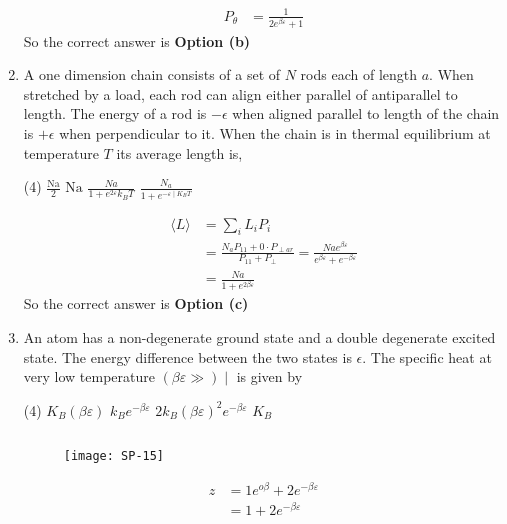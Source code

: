 \begin{enumerate}
\begin{answer}
\begin{align*}
		P_{\theta}&=\frac{1}{2 e^{\beta \varepsilon}+1}
		\end{align*}
		So the correct answer is \textbf{Option (b)}
	\end{answer}
	\item A one dimension chain consists of a set of $N$ rods each of length $a$. When stretched by a load, each rod can align either parallel of antiparallel to length. The energy of a rod is $-\epsilon$ when aligned parallel to length of the chain is $+\epsilon$ when perpendicular to it. When the chain is in thermal equilibrium at temperature $T$ its average length is,
	\begin{tasks}(4)
		\task[\textbf{a.}]$\frac{\mathrm{Na}}{2}$
		\task[\textbf{b.}]$\mathrm{Na}$
		\task[\textbf{c.}]$\frac{N a}{1+e^{2 \varepsilon} k_{B} T}$
		\task[\textbf{d.}] $\frac{N_{a}}{1+e^{-\varepsilon \mid K_{B} T}}$
	\end{tasks}
	\begin{answer}
		\begin{align*}
		\langle L\rangle&=\sum_{i} L_{i} P_{i}\\
		&=\frac{N_{a} P_{11}+0 \cdot P_{\perp a r}}{P_{11}+P_{\perp}}=\frac{N a e^{\beta \varepsilon}}{e^{\beta \varepsilon}+e^{-\beta \varepsilon}}\\
		&=\frac{N a}{1+e^{2 \beta \varepsilon}}
		\end{align*}
		So the correct answer is \textbf{Option (c)}
	\end{answer}
	\item An atom has a non-degenerate ground state and a double degenerate excited state. The energy difference between the two states is $\epsilon$. The specific heat at very low temperature $(\beta \varepsilon \gg) \mid$ is given by
	\begin{tasks}(4)
		\task[\textbf{a.}]$K_{B}(\beta \varepsilon)$
		\task[\textbf{b.}]$k_{B} e^{-\beta \varepsilon}$
		\task[\textbf{c.}]$2 k_{B}(\beta \varepsilon)^{2} e^{-\beta \varepsilon}$
		\task[\textbf{d.}] $K_{B}$
	\end{tasks}
	\begin{answer}$\left. \right. $\\
		\begin{figure}[H]
			\centering
			\texttt{[image: SP-15]}
		\end{figure}
		\begin{align*}
		z &=1 e^{o \beta}+2 e^{-\beta \varepsilon} \\
		&=1+2 e^{-\beta \varepsilon}\\

\end{align*}
\end{answer}
\end{enumerate}

